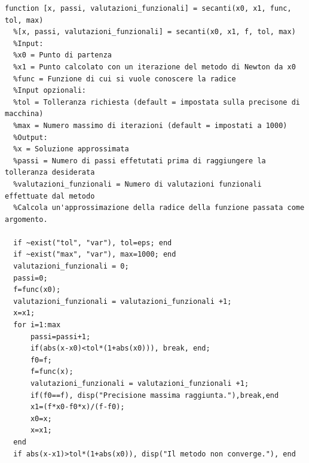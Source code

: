 \documentclass[10pt,a4paper]{article}
\begin{document}
\begin{lstlisting}[style=Matlab-editor]
  function [x, passi, valutazioni_funzionali] = secanti(x0, x1, func, tol, max)
  %[x, passi, valutazioni_funzionali] = secanti(x0, x1, f, tol, max)
  %Input:
  %x0 = Punto di partenza
  %x1 = Punto calcolato con un iterazione del metodo di Newton da x0
  %func = Funzione di cui si vuole conoscere la radice
  %Input opzionali:
  %tol = Tolleranza richiesta (default = impostata sulla precisone di macchina)
  %max = Numero massimo di iterazioni (default = impostati a 1000)
  %Output:
  %x = Soluzione approssimata
  %passi = Numero di passi effetutati prima di raggiungere la tolleranza desiderata 
  %valutazioni_funzionali = Numero di valutazioni funzionali effettuate dal metodo
  %Calcola un'approssimazione della radice della funzione passata come argomento.
  
  if ~exist("tol", "var"), tol=eps; end 
  if ~exist("max", "var"), max=1000; end
  valutazioni_funzionali = 0;
  passi=0;
  f=func(x0);
  valutazioni_funzionali = valutazioni_funzionali +1;
  x=x1;
  for i=1:max
      passi=passi+1;
      if(abs(x-x0)<tol*(1+abs(x0))), break, end;
      f0=f;
      f=func(x);
      valutazioni_funzionali = valutazioni_funzionali +1;
      if(f0==f), disp("Precisione massima raggiunta."),break,end
      x1=(f*x0-f0*x)/(f-f0); 
      x0=x;
      x=x1;
  end
  if abs(x-x1)>tol*(1+abs(x0)), disp("Il metodo non converge."), end
\end{lstlisting}
\end{document}
